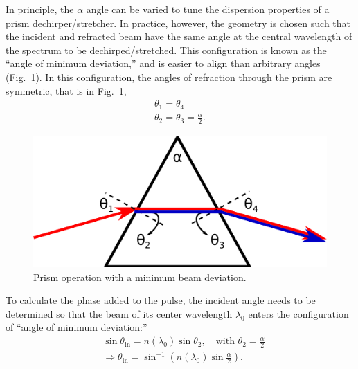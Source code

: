 \documentclass[12pt,hidelinks]{book}
\begin{document}
In principle, the $\alpha$ angle can be varied to tune the dispersion properties of a prism dechirper/stretcher. In practice, however, the geometry is chosen such that the incident and refracted beam have the same angle at the central wavelength of the spectrum to be dechirped/stretched. This configuration is known as the ``angle of minimum deviation,'' and is easier to align than arbitrary angles (Fig.~\ref{fig:prism_enlarged}). In this configuration, the angles of refraction through the prism are symmetric, that is in Fig.~\ref{fig:prism_enlarged},
\begin{subequations}
\begin{align}
\theta_1=\theta_4 \\
\theta_2=\theta_3=\frac{\alpha}{2}.
\end{align}
\end{subequations}
\begin{figure}[htbp]
\centering
\includegraphics[width=0.4\linewidth]{prism_enlarged.pdf}
\caption{Prism operation with a minimum beam deviation.}
\label{fig:prism_enlarged}
\end{figure}

To calculate the phase added to the pulse, the incident angle needs to be determined so that the beam of its center wavelength $\lambda_0$ enters the configuration of ``angle of minimum deviation:''
\begin{align}
& \sin\theta_{\text{in}}=n(\lambda_0)\sin\theta_2,\quad\text{with }\theta_2=\frac{\alpha}{2} \nonumber \\
&\Rightarrow \theta_{\text{in}}=\sin^{-1}\left(n(\lambda_0)\sin\frac{\alpha}{2}\right). \label{eq:prism_theta_in}
\end{align}
\end{document}

